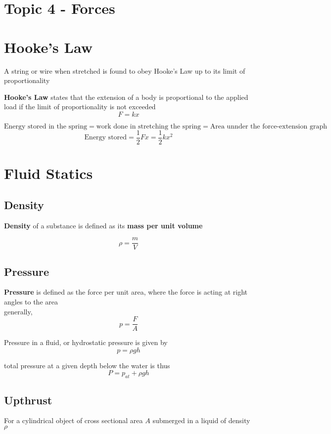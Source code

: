 \documentclass[a4paper, 10pt]{article}
\begin{document}
\section*{Topic 4 - Forces}

\section{Hooke's Law}
A string or wire when stretched is found to obey Hooke's Law up to its limit of proportionality
\begin{framed}
   \textbf{Hooke's Law} states that the extension of a body is proportional to the applied load if the limit of proportionality is not exceeded
   \[
   F = kx
   \]
   
\end{framed}	

\[
   \text{Energy stored in the spring} = \text{work done in stretching the spring} = \text{Area unnder the force-extension graph}
\]
\[
   \text{Energy stored} = \frac{1}{2}Fx = \frac{1}{2}kx^2
\]

\section{Fluid Statics}
\subsection{Density}
\textbf{Density} of a substance is defined as its \textbf{mass per unit volume}

\[
\rho = \frac{m}{V}
\]
\subsection{Pressure}
\textbf{Pressure} is defined as the force per unit area, where the force is acting at right angles to the area \\

generally, 
\[
p = \frac{F}{A}
\]

Pressure in a fluid, or hydrostatic pressure is given by
\[
p = \rho gh
\]

total pressure at a given depth below the water is thus
\[
   P = p_{at} + \rho gh
\]

\subsection{Upthrust}
For a cylindrical object of cross sectional area $A$ submerged in a liquid of density $\rho$\\
\end{document}
